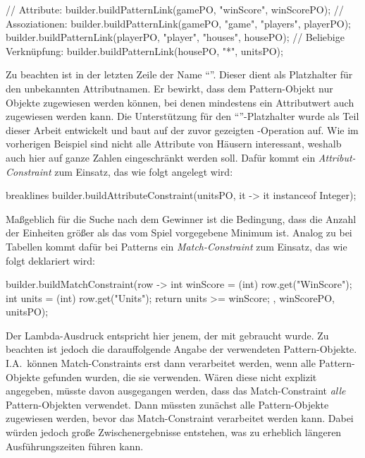 \begin{jcodeblock}
    // Attribute:
    builder.buildPatternLink(gamePO, "winScore", winScorePO);
    // Assoziationen:
    builder.buildPatternLink(gamePO, "game", "players", playerPO);
    builder.buildPatternLink(playerPO, "player", "houses", housePO);
    // Beliebige Verknüpfung:
    builder.buildPatternLink(housePO, "*", unitsPO);
\end{jcodeblock}

Zu beachten ist in der letzten Zeile der Name ``\code{*}''.
Dieser dient als Platzhalter für den unbekannten Attributnamen.
Er bewirkt, dass dem Pattern-Objekt  nur Objekte zugewiesen werden können, bei denen mindestens ein Attributwert auch  zugewiesen werden kann.
Die Unterstützung für den  ``\code{*}''-Platzhalter wurde als Teil dieser Arbeit entwickelt und baut auf der zuvor gezeigten -Operation auf.
Wie im vorherigen Beispiel sind nicht alle Attribute von Häusern interessant,
weshalb auch hier auf ganze Zahlen eingeschränkt werden soll.
Dafür kommt ein \emph{Attribut-Constraint} zum Einsatz, das wie folgt angelegt wird:

\begin{jcodeblock*}{breaklines}
    builder.buildAttributeConstraint(unitsPO, it -> it instanceof Integer);
\end{jcodeblock*}

Maßgeblich für die Suche nach dem Gewinner ist die Bedingung, dass die Anzahl der Einheiten größer als das vom Spiel vorgegebene Minimum ist.
Analog zu  bei Tabellen kommt dafür bei Patterns ein \emph{Match-Constraint} zum Einsatz,
das wie folgt deklariert wird:

\begin{jcodeblock}
    builder.buildMatchConstraint(row -> {
        int winScore = (int) row.get("WinScore");
        int units = (int) row.get("Units");
        return units >= winScore;
    }, winScorePO, unitsPO);
\end{jcodeblock}

Der Lambda-Ausdruck entspricht hier jenem, der mit  gebraucht wurde.
Zu beachten ist jedoch die darauffolgende Angabe der verwendeten Pattern-Objekte.
I.A.\ können Match-Constraints erst dann verarbeitet werden, wenn alle Pattern-Objekte gefunden wurden, die sie verwenden.
Wären diese nicht explizit angegeben, müsste davon ausgegangen werden, dass das Match-Constraint \emph{alle} Pattern-Objekten verwendet.
Dann müssten zunächst alle Pattern-Objekte zugewiesen werden, bevor das Match-Constraint verarbeitet werden kann.
Dabei würden jedoch große Zwischenergebnisse entstehen, was zu erheblich längeren Ausführungszeiten führen kann.


